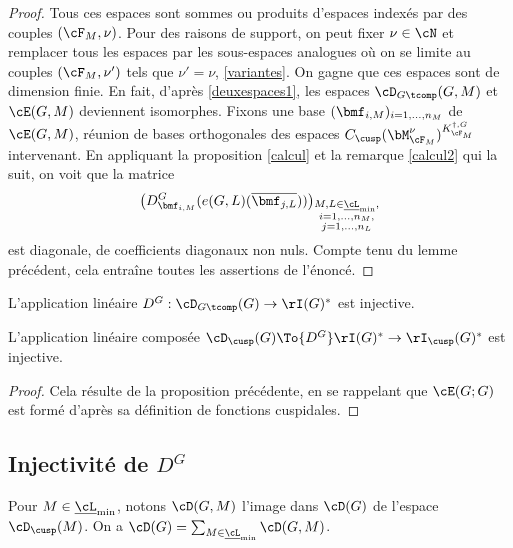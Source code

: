\begin{proof}
Tous ces espaces sont sommes ou produits d'espaces indexés par des couples $(\cF_{M},\nu)$. Pour des raisons de support, on peut fixer $\nu\in \cN$ et remplacer tous les espaces par les sous-espaces analogues où on se limite au couples $(\cF_{M},\nu')$ tels que $\nu'=\nu$, \cf \ref{variantes}. On gagne que ces espaces sont de dimension finie. En fait, d'après \eqref{deuxespaces1}, les espaces $\cD_{G\tcomp}(G,M)$ et $\cE(G,M)$ deviennent isomorphes. Fixons une base $(\bmf_{i,M})_{i=1,\dots,n_{M}}$ de $\cE(G,M)$, réunion de bases orthogonales des espaces $C_{\cusp}(\bM^{\nu}_{\cF_{M}})^{K_{\cF_{M}}^{\dag,G}}$ intervenant. En appliquant la proposition \ref{calcul} et la remarque \eqref{calcul2} qui la suit, on voit
que la matrice
\[
\big(D^G_{\bmf_{i,M}}(e(G,L)(\overline{\bmf_{j,L}}))\big)_{\substack{M,L\in \underline{\cL}_{\min},\\
i=1,\dots,n_{M},\\
j=1,\dots,n_{L}}}
\]
est diagonale, de coefficients diagonaux non nuls. Compte tenu du lemme précédent, cela entraîne toutes les assertions de l'énoncé.
\end{proof}

\label{uncorollaire}

\skpt
\begin{cor*}
\begin{enumeratei}
\item\label{uncorollairei}
L'application linéaire $D^G:\cD_{G\tcomp}(G)\to \rI(G)^*$ est injective.

\item\label{uncorollaireii}
L'application linéaire composée $\cD_{\cusp}(G)\To{D^G}\rI(G)^*\to \rI_{\cusp}(G)^*$ est injective.
\end{enumeratei}
\end{cor*}

\begin{proof}
Cela résulte de la proposition précédente, en se rappelant que $\cE(G;G)$ est formé d'après sa définition de fonctions cuspidales.
\end{proof}

\subsection{Injectivité de \texorpdfstring{$D^G$}{DG}}\label{injectivite}
Pour $M\in \underline{\cL}_{\min}$, notons $\cD(G,M)$ l'image dans $\cD(G)$ de
l'espace $\cD_{\cusp}(M)$. On a $\cD(G)=\sum_{M\in \underline{\cL}_{\min}}\cD(G,M)$.

